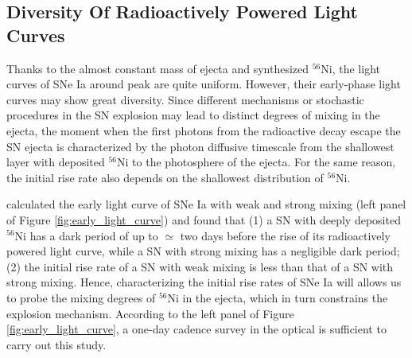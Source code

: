 \documentclass[11pt]{article}
\begin{document}
\subsection{Diversity Of Radioactively Powered Light Curves}
\label{sec:diversity_of_radioactively_powered_light_curves}

Thanks to the almost constant mass of ejecta and synthesized
$^{56}$Ni, the light curves of SNe Ia around peak are quite
uniform. However, their early-phase light curves may show great
diversity. Since different mechanisms or stochastic procedures in the
SN explosion may lead to distinct degrees of mixing in the ejecta, the
moment when the first photons from the radioactive decay escape the SN
ejecta is characterized by the photon diffusive timescale from the
shallowest layer with deposited $^{56}$Ni to the photosphere of the
ejecta. For the same reason, the initial rise rate also depends on the
shallowest distribution of $^{56}$Ni.

\citet{2016ApJ...826...96P} calculated the early light curve of SNe Ia
with weak and strong mixing (left panel of Figure
\ref{fig:early_light_curve}) and found that (1) a SN with deeply
deposited $^{56}$Ni has a dark period of up to $\simeq$ two days
before the rise of its radioactively powered light curve, while a SN
with strong mixing has a negligible dark period; (2) the initial rise
rate of a SN with weak mixing is less than that of a SN with strong
mixing.  Hence, characterizing the initial rise rates of SNe Ia will
allows us to probe the mixing degrees of $^{56}$Ni in the ejecta, which
in turn constrains the explosion mechanism. According to the left panel
of Figure \ref{fig:early_light_curve}, a one-day cadence survey in the
optical is sufficient to carry out this study.
\end{document}
